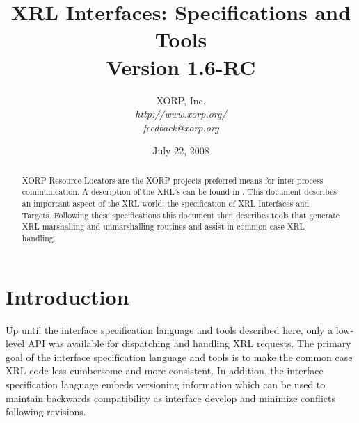 \documentclass[11pt]{article}
\begin{document}
\title{XRL Interfaces: Specifications and Tools \\
\vspace{1ex}
Version 1.6-RC}
\author{ XORP, Inc.					\\
         {\it http://www.xorp.org/}			\\
	 {\it feedback@xorp.org}
}
\date{July 22, 2008}

\maketitle


%
%
\newcommand{\clntgen}{{\sf clnt-gen}~}
\newcommand{\tgtgen}{{\sf tgt-gen}~}


\begin{abstract}

XORP Resource Locators are the XORP projects preferred means for
inter-process communication.  A description of the XRL's can be found
in \cite{xorp:xrl}.  This document describes an important aspect of the XRL
world: the specification of XRL Interfaces and Targets.  Following
these specifications this document then describes tools that generate
XRL marshalling and unmarshalling routines and assist in common case
XRL handling.

\end{abstract}

\section{Introduction}

Up until the interface specification language and tools described
here, only a low-level API was available for dispatching and handling
XRL requests.  The primary goal of the interface specification
language and tools is to make the common case XRL code less cumbersome
and more consistent.  In addition, the interface specification
language embeds versioning information which can be used to maintain
backwards compatibility as interface develop and minimize conflicts
following revisions.
\end{document}
